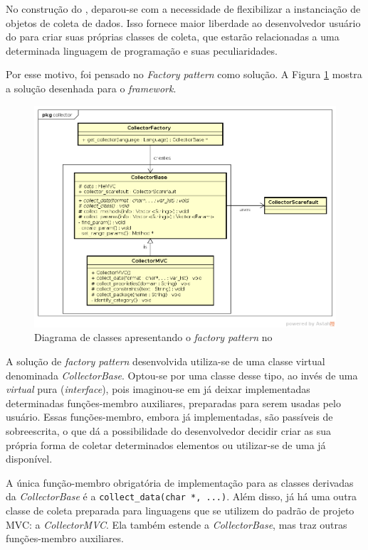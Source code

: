 No construção do \scarefault, deparou-se com a necessidade de flexibilizar
a instanciação de objetos de coleta de dados. Isso fornece maior liberdade
ao desenvolvedor usuário do \framework para criar suas próprias classes de
coleta, que estarão relacionadas a uma determinada linguagem de programação
e suas peculiaridades.

Por esse motivo, foi pensado no \textit{Factory pattern} como solução. A Figura
\ref{collector-diagram} mostra a solução desenhada para o \textit{framework}.


\begin{figure}[h]
  \centering
    \includegraphics[width=\textwidth]{figuras/collector-diagram.png}
    \caption{Diagrama de classes apresentando o \textit{factory pattern} no \framework}
    \label{collector-diagram}
\end{figure}
\FloatBarrier

A solução de \textit{factory pattern} desenvolvida utiliza-se de uma classe
\textsf{virtual} denominada \textit{CollectorBase}. Optou-se por uma classe
desse tipo, ao invés de uma \textit{virtual} pura (\textit{interface}), pois
imaginou-se em já deixar implementadas determinadas funções-membro auxiliares,
preparadas para serem usadas pelo usuário. Essas funções-membro, embora já implementadas,
são passíveis de sobreescrita, o que dá a possibilidade do desenvolvedor
decidir criar as sua própria forma de coletar determinados elementos ou utilizar-se
de uma já disponível.

A única função-membro obrigatória de implementação para as classes derivadas da
\textit{CollectorBase} é a \lstinline|collect_data(char *, ...)|. Além disso, já
há uma outra classe de coleta preparada para linguagens que se utilizem do padrão
de projeto MVC: a \textit{CollectorMVC}. Ela também estende a \textit{CollectorBase},
mas traz outras funções-membro auxiliares.

